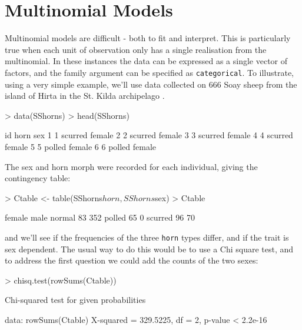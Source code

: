 \documentclass{article}
\begin{document}
\section{Multinomial Models}

Multinomial models are difficult - both to fit and interpret.  This is particularly true when each unit of observation only has a single realisation from the multinomial. In these instances the data can be expressed as a single vector of factors, and the family argument can be specified as \texttt{categorical}.  To illustrate, using a very simple example, we'll use data collected on 666 Soay sheep from the island of Hirta in the St. Kilda archipelago \citep[][Table A2.5]{Clutton-Brock.2004}. 


\begin{Schunk}
\begin{Sinput}
> data(SShorns)
> head(SShorns)
\end{Sinput}
\begin{Soutput}
  id    horn    sex
1  1 scurred female
2  2 scurred female
3  3 scurred female
4  4 scurred female
5  5  polled female
6  6  polled female
\end{Soutput}
\end{Schunk}

The sex and horn morph were recorded for each individual, giving the contingency table:  

\begin{Schunk}
\begin{Sinput}
> Ctable <- table(SShorns$horn, SShorns$sex)
> Ctable
\end{Sinput}
\begin{Soutput}
          female male
  normal      83  352
  polled      65    0
  scurred     96   70
\end{Soutput}
\end{Schunk}

and we'll see if the frequencies of the three \texttt{horn} types differ, and if the trait is sex dependent. The usual way to do this would be to use a Chi square test, and to address the first question we could add the counts of the two sexes: 

\begin{Schunk}
\begin{Sinput}
> chisq.test(rowSums(Ctable))
\end{Sinput}
\begin{Soutput}
	Chi-squared test for given probabilities

data:  rowSums(Ctable) 
X-squared = 329.5225, df = 2, p-value < 2.2e-16
\end{Soutput}
\end{Schunk}
\end{document}
